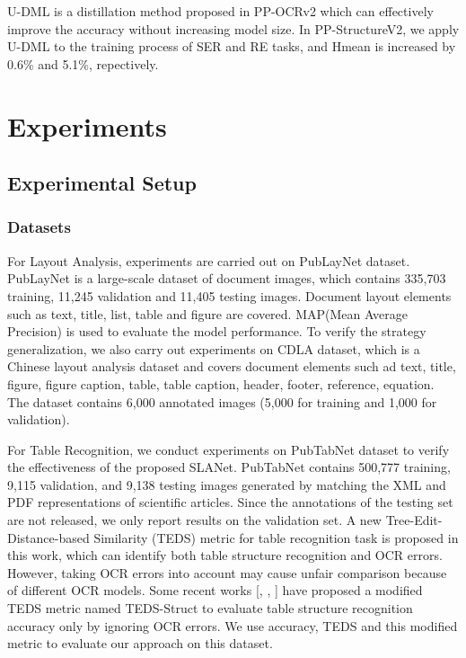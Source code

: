 \documentclass[letterpaper]{article} \usepackage{aaai21}  \usepackage{times}  \usepackage{helvet} \usepackage{courier}  \usepackage[hyphens]{url}  \usepackage{graphicx} \usepackage{algorithm}
\begin{document}
U-DML is a distillation method proposed in PP-OCRv2\cite{ppocrv2} which can effectively improve the accuracy without increasing model size. In PP-StructureV2, we apply U-DML to the training process of SER and RE tasks, and Hmean is increased by 0.6\% and 5.1\%, repectively.


\section{Experiments}
\subsection{Experimental Setup}
\subsubsection{Datasets}

For Layout Analysis, experiments are carried out on PubLayNet dataset\cite{publaynet}. PubLayNet is a large-scale dataset of document images, which contains 335,703 training, 11,245 validation and 11,405 testing images. Document layout elements such as text, title, list, table and figure are covered. MAP(Mean Average Precision) is used to evaluate the model performance. To verify the strategy generalization, we also carry out experiments on CDLA dataset\cite{cdla}, which is a Chinese layout analysis dataset and covers document elements such ad text, title, figure, figure caption, table, table caption, header, footer, reference, equation. The dataset contains 6,000 annotated images (5,000 for training and 1,000 for validation). 

For Table Recognition, we conduct experiments on PubTabNet\cite{PubTabNet} dataset to verify the effectiveness of the proposed SLANet. PubTabNet contains 500,777 training, 9,115 validation, and 9,138 testing images generated by matching the XML and PDF representations of scientific articles. Since the annotations of the testing set are not released, we only report results on the validation set. A new Tree-Edit-Distance-based Similarity (TEDS) metric for table recognition task is proposed in this work, which can identify both table structure recognition and OCR errors. However, taking OCR errors into account may cause unfair comparison because of different OCR models. Some recent works [\cite{TableStruct-Net}, \cite{Lgpma}, \cite{gte}] have proposed a modified TEDS metric named TEDS-Struct to evaluate table structure recognition accuracy only by ignoring OCR errors. We use accuracy, TEDS and this modified metric to evaluate our approach on this dataset.
\end{document}
